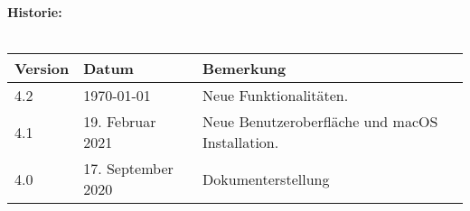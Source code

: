 \textbf{Historie:}
\\\\
\makeatletter
\begin{tabularx}{\textwidth}{llX} \toprule
	\textbf{Version}	& \textbf{Datum}		& \textbf{Bemerkung}		\\ \midrule
	4.2					& \today				& Neue Funktionalitäten.	\\
	4.1					& 19. Februar 2021		& Neue Benutzeroberfläche und macOS Installation.	\\
	4.0					& 17. September 2020	& Dokumenterstellung		\\ \bottomrule
	\hline
\end{tabularx}
\makeatother
